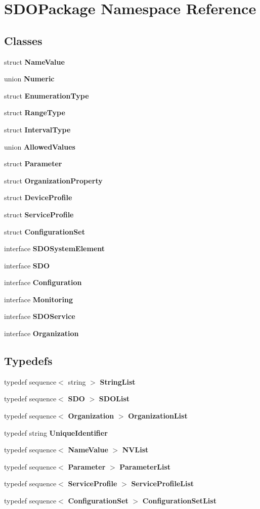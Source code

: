 \section{SDOPackage Namespace Reference}
\label{namespaceSDOPackage}
\subsection*{Classes}
\begin{DoxyCompactItemize}
\item 
struct {\bf NameValue}
\item 
union {\bf Numeric}
\item 
struct {\bf EnumerationType}
\item 
struct {\bf RangeType}
\item 
struct {\bf IntervalType}
\item 
union {\bf AllowedValues}
\item 
struct {\bf Parameter}
\item 
struct {\bf OrganizationProperty}
\item 
struct {\bf DeviceProfile}
\item 
struct {\bf ServiceProfile}
\item 
struct {\bf ConfigurationSet}
\item 
interface {\bf SDOSystemElement}
\item 
interface {\bf SDO}
\item 
interface {\bf Configuration}
\item 
interface {\bf Monitoring}
\item 
interface {\bf SDOService}
\item 
interface {\bf Organization}
\end{DoxyCompactItemize}
\subsection*{Typedefs}
\begin{DoxyCompactItemize}
\item 
typedef sequence$<$ string $>$ {\bf StringList}
\item 
typedef sequence$<$ {\bf SDO} $>$ {\bf SDOList}
\item 
typedef sequence$<$ {\bf Organization} $>$ {\bf OrganizationList}
\item 
typedef string {\bf UniqueIdentifier}
\item 
typedef sequence$<$ {\bf NameValue} $>$ {\bf NVList}
\item 
typedef sequence$<$ {\bf Parameter} $>$ {\bf ParameterList}
\item 
typedef sequence$<$ {\bf ServiceProfile} $>$ {\bf ServiceProfileList}
\item 
typedef sequence$<$ {\bf ConfigurationSet} $>$ {\bf ConfigurationSetList}
\end{DoxyCompactItemize}
